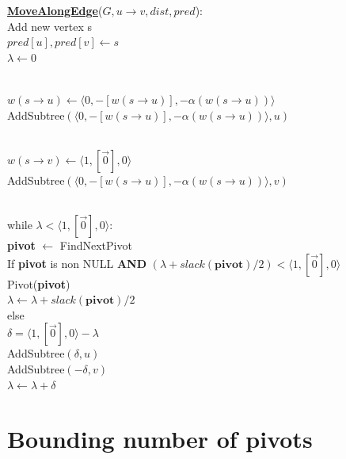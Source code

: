 \documentclass{article}
\begin{document}
\begin{center}
\begin{algorithm}
\textbf{\underline{MoveAlongEdge}}($G, u \rightarrow v, dist, pred$): \\ \quad
Add new vertex s \\ \quad
$pred[u], pred[v] \leftarrow s$ \\ \quad
$\lambda \leftarrow 0$ \\ \\ \quad

$w(s \rightarrow u) \leftarrow \langle 0, -[w(s \rightarrow u)], 
-\alpha(w(s \rightarrow u)) \rangle$ \\ \quad
AddSubtree$(\langle 0, -[w(s \rightarrow u)], 
-\alpha(w(s \rightarrow u)) \rangle, u)$ \\ \\ \quad

$w(s \rightarrow v) \leftarrow \langle 1, [\vec{0}], 0 \rangle$ \\ \quad
AddSubtree$(\langle 0, -[w(s \rightarrow u)], 
-\alpha(w(s \rightarrow u)) \rangle, v)$ \\ \\ \quad

while $\lambda < \langle 1, [\vec{0}], 0 \rangle$: \\ \quad \quad
    \textbf{pivot} $\leftarrow $ FindNextPivot \\ \quad \quad
    If \textbf{pivot} is non NULL \textbf{AND} 
    $(\lambda + slack(\textbf{pivot}) / 2) < \langle 1, [\vec{0}], 0 \rangle$ \\ \qquad \quad
        Pivot(\textbf{pivot}) \\ \qquad \quad
        $\lambda \leftarrow \lambda + slack(\textbf{pivot}) / 2$ \\ \quad \quad
    else \\ \qquad \quad
        $\delta = \langle 1, [\vec{0}], 0 \rangle - \lambda$ \\ \qquad \quad
        AddSubtree$(\delta, u)$ \\ \qquad \quad
        AddSubtree$(-\delta, v)$ \\ \qquad \quad
        $\lambda \leftarrow \lambda + \delta$ \\
\end{algorithm}
\end{center}

\section{Bounding number of pivots}
\end{document}
